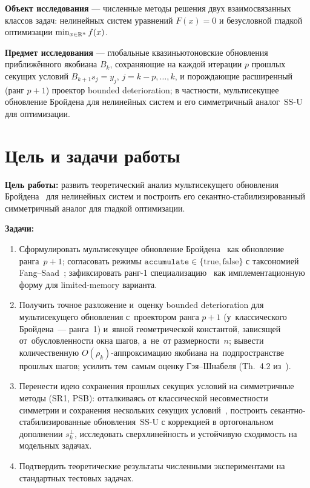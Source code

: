 \textbf{Объект исследования} --- численные методы решения двух
взаимосвязанных классов задач: нелинейных систем уравнений
$F(x) = 0$ и безусловной гладкой оптимизации $\min_{x\in\mathbb{R}^n} f(x)$.

\textbf{Предмет исследования} --- глобальные квазиньютоновские
обновления приближённого якобиана $B_k$, сохраняющие на каждой
итерации $p$ прошлых секущих условий $B_{k+1}s_j = y_j$,
$j=k{-}p,\ldots,k$, и порождающие расширенный (ранг $p{+}1$)
проектор bounded deterioration; в частности, мультисекущее обновление
Бройдена для нелинейных систем и его симметричный аналог~SS-U для
оптимизации.

\section*{Цель и задачи работы}

\textbf{Цель работы:} развить теоретический анализ мультисекущего
обновления Бройдена~\cite{schnabel1983} для нелинейных систем и
построить его секантно-стабилизированный симметричный аналог для
гладкой оптимизации.

\textbf{Задачи:}
\begin{enumerate}[leftmargin=*]
  \item Сформулировать мультисекущее обновление
        Бройдена~\cite{schnabel1983} как обновление ранга~$p+1$;
        согласовать режимы $\mathtt{accumulate}\in\{\text{true},\text{false}\}$
        с таксономией Fang--Saad~\cite{fang2009}; зафиксировать
        ранг-1 специализацию~\cite{gay_schnabel1978} как имплементационную
        форму для limited-memory варианта.
  \item Получить точное разложение и~оценку bounded deterioration для
        мультисекущего обновления с~проектором ранга $p{+}1$ (у~классического
        Бройдена~--- ранга~1) и~явной геометрической константой, зависящей
        от~обусловленности окна шагов, а~не~от размерности~$n$; вывести
        количественную $O(\rho_k)$-аппроксимацию якобиана на~подпространстве
        прошлых шагов; усилить тем~самым оценку Гэя--Шнабеля
        (Th.~4.2 из~\cite{gay_schnabel1978}).
  \item Перенести идею сохранения прошлых секущих условий
        на симметричные методы (SR1, PSB): отталкиваясь от
        классической несовместности симметрии и сохранения
        нескольких секущих условий~\cite{schnabel1983}, построить
        секантно-стабилизированные обновления~SS-U с коррекцией в
        ортогональном дополнении $s_k^{\perp}$, исследовать
        сверхлинейность и устойчивую сходимость на модельных задачах.
  \item Подтвердить теоретические результаты численными экспериментами
        на стандартных тестовых задачах.
\end{enumerate}

